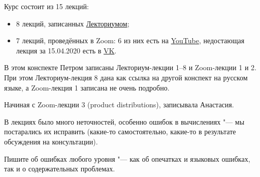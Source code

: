 Курс состоит из 15 лекций:
\begin{itemize}
    \item 8 лекций, записанных \href{https://www.lektorium.tv/node/36683}{Лекториумом};
    \item 7 лекций, проведённых в Zoom: 6 из них есть на \href{https://www.youtube.com/playlist?list=PLKXEsFnBcT5ABaSHIAe0lKDnL8CLzmn5z}{YouTube}, недостающая лекция за 15.04.2020 есть в  \href{https://vk.com/videos-193571461?section=album_34}{VK}.
\end{itemize}

В этом конспекте Петром записаны Лекториум-лекции 1--8 и Zoom-лекции 1 и 2. При этом Лекториум-лекция 8 дана как ссылка на другой конспект на русском языке, а Zoom-лекция 1 записана не очень подробно.

Начиная с Zoom-лекции 3 (product distributions), записывала Анастасия.

В лекциях было много неточностей, особенно ошибок в вычислениях "--- мы постарались их исправить (какие-то самостоятельно, какие-то в результате обсуждения на консультации).

Пишите об ошибках любого уровня "--- как об опечатках и языковых ошибках, так и о содержательных проблемах.